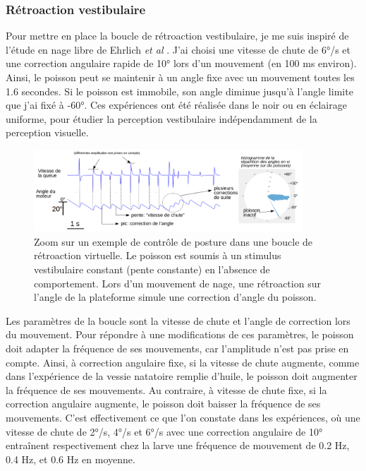 \subsubsection{Rétroaction vestibulaire}
Pour mettre en place la boucle de rétroaction vestibulaire, je me suis inspiré de l'étude en nage libre de Ehrlich \emph{et al} \cite{ehrlich_control_2017}. J'ai choisi une vitesse de chute de 6°/s et une correction angulaire rapide de 10° lors d'un mouvement (en 100 ms environ). Ainsi, le poisson peut se maintenir à un angle fixe avec un mouvement toutes les 1.6 secondes. Si le poisson est immobile, son angle diminue jusqu'à l'angle limite que j'ai fixé à -60°. Ces expériences ont été réalisée dans le noir ou en éclairage uniforme, pour étudier la perception vestibulaire indépendamment de la perception visuelle.

\begin{figure}
\centering
\includegraphics[width=0.9\textwidth]{./files/vestibular_feedback.svg.png}
\caption{Zoom sur un exemple de contrôle de posture dans une boucle de rétroaction virtuelle. Le poisson est soumis à un stimulus vestibulaire constant (pente constante) en l'absence de comportement. Lors d'un mouvement de nage, une rétroaction sur l'angle de la plateforme simule une correction d'angle du poisson.}
\end{figure}

Les paramètres de la boucle sont la vitesse de chute et l'angle de correction lors du mouvement. Pour répondre à une modifications de ces paramètres, le poisson doit adapter la fréquence de ses mouvements, car l'amplitude n'est pas prise en compte. Ainsi, à correction angulaire fixe, si la vitesse de chute augmente, comme dans l'expérience de la vessie natatoire remplie d'huile, le poisson doit augmenter la fréquence de ses mouvements. Au contraire, à vitesse de chute fixe, si la correction angulaire augmente, le poisson doit baisser la fréquence de ses mouvements. C'est effectivement ce que l'on constate dans les expériences, où une vitesse de chute de 2°/s, 4°/s et 6°/s avec une correction angulaire de 10° entraînent respectivement chez la larve une fréquence de mouvement de 0.2 Hz, 0.4 Hz, et 0.6 Hz en moyenne.

